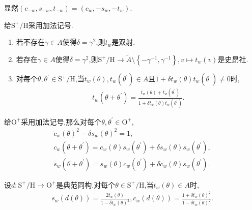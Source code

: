 \begin{remark}{}{}
	显然$\left(c_{-w},s_{-w},t_{-w}\right)=\left(c_{w},-s_{w},-t_{w}\right)$.
\end{remark}

\begin{proposition}{}{}
	给$\mathrm{S}^{+}/\mathrm{H}$采用加法记号.
	\begin{enumerate}
		\item 若不存在$\gamma\in A$使得$\delta=\gamma^{2}$,则$t_{w}$是双射.
		\item 若存在$\gamma\in A$使得$\delta=\gamma^{2}$,则$\mathrm{S}^{+}/\mathrm{H}\to\tilde{A}\setminus\left\{-\gamma^{-1},\gamma^{-1}\right\},v\mapsto t_{w}\left(v\right)$是史昂社.
		\item 对每个$\theta,\theta^{\prime}\in\mathrm{S}^{+}/\mathrm{H}$,当$t_{w}\left(\theta\right),t_{w}\left(\theta^{\prime}\right)\in A$且$1+\delta t_{w}\left(\theta\right)t_{w}\left(\theta^{\prime}\right)\neq 0$时,
		\begin{align}
			t_{w}\left(\theta+\theta^{\prime}\right)=\frac{t_{w}\left(\theta\right)+t_{w}\left(\theta^{\prime}\right)}{1+\delta t_{w}\left(\theta\right)t_{w}\left(\theta^{\prime}\right)}.
		\end{align}
	\end{enumerate}
\end{proposition}

\begin{proposition}{}{}
	给$\mathrm{O}^{+}$采用加法记号,那么对每个$\theta,\theta^{\prime}\in\mathrm{O}^{+}$,
	\begin{gather}
		c_{w}\left(\theta\right)^{2}-\delta s_{w}\left(\theta\right)^{2}=1,\\
		c_{w}\left(\theta+\theta^{\prime}\right)=c_{w}\left(\theta\right)s_{w}\left(\theta^{\prime}\right)+\delta s_{w}\left(\theta\right)s_{w}\left(\theta^{\prime}\right),\\
		s_{w}\left(\theta+\theta^{\prime}\right)=s_{w}\left(\theta\right)c_{w}\left(\theta^{\prime}\right)+\delta c_{w}\left(\theta\right)s_{w}\left(\theta^{\prime}\right).
	\end{gather}
\end{proposition}

\begin{proposition}{}{}
	设$d:\mathrm{S}^{+}/\mathrm{H}\to\mathrm{O}^{+}$是典范同构.对每个$\theta\in\mathrm{S}^{+}/\mathrm{H}$,当$t_{w}\left(\theta\right)\in A$时,
	\begin{align}
		s_{w}\left(d\left(\theta\right)\right)=\frac{2t_{w}\left(\theta\right)}{1-\delta t_{w}\left(\theta\right)^{2}},
		c_{w}\left(d\left(\theta\right)\right)=\frac{1+\delta t_{w}\left(\theta\right)^{2}}{1-\delta t_{w}\left(\theta\right)^{2}}.
	\end{align}
\end{proposition}


